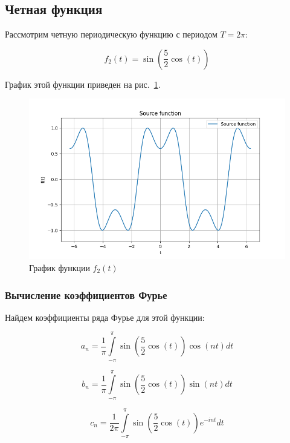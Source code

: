 \subsection{Четная функция}

Рассмотрим четную периодическую функцию с периодом $T = 2\pi$:

\begin{equation}
    f_2(t) = \sin\left(\frac{5}{2} \cos(t)\right)
\end{equation}

График этой функции приведен на рис.~\ref{fig:func_2}.

\begin{figure}[ht!]
    \centering
    \includegraphics[width=\textwidth]{media/plots/func_2.png}
    \caption{График функции $f_2(t)$}
    \label{fig:func_2}
\end{figure}

\subsubsection{Вычисление коэффициентов Фурье}
Найдем коэффициенты ряда Фурье для этой функции:

\begin{equation}
    a_n = \frac{1}{\pi}\int\limits_{-\pi}^{\pi} \sin\left(\frac{5}{2} \cos\left(t\right)\right)\cos\left( n t \right) dt 
\end{equation}

\begin{equation}
    b_n = \frac{1}{\pi}\int\limits_{-\pi}^{\pi} \sin\left(\frac{5}{2} \cos\left(t\right)\right)\sin\left( n t \right) dt 
\end{equation}

\begin{equation}
    c_n = \frac{1}{2\pi}\int\limits_{-\pi}^{\pi}  \sin\left(\frac{5}{2} \cos\left(t\right)\right) e^{-int} dt 
\end{equation}

